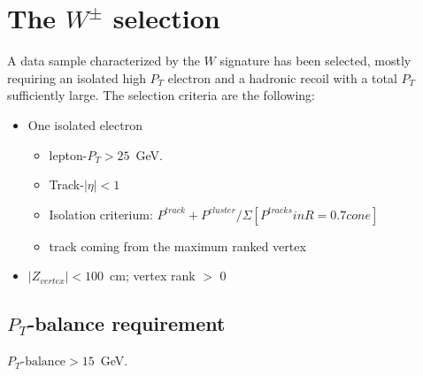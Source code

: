 \documentclass[12pt]{article}
\begin{document}




\section{The $W^{\pm}$ selection}
\label{Wselection}
A data sample characterized by the $W$ signature has been selected, mostly requiring an isolated high $P_{T}$ electron and a hadronic recoil with a total $P_{T}$ sufficiently large. The selection criteria are the following:

\begin{itemize}
\item One isolated electron
    \begin{itemize}
    \item lepton-$P_{T}>25$~GeV.
    \item Track-$|\eta|<1$
    \item Isolation criterium: $P^{track}+P^{cluster}/\Sigma[P^{tracks} in R=0.7 cone]$
    \item track coming from the maximum ranked vertex
    \end{itemize}
\item $|Z_{vertex}| < 100$~cm; vertex rank $>$ 0    
\end{itemize}

\subsection{$P_{T}$-balance requirement}
$P_{T}\text{-balance} > 15$~GeV.
 
\end{document}

